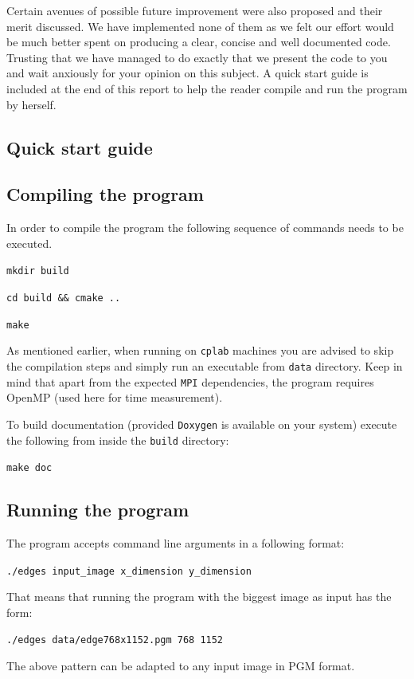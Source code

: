 \documentclass[11pt,a4paper]{article}
\begin{document}
Certain avenues of possible future improvement were also proposed and their merit discussed.
We have implemented none of them as we felt our effort would be much better spent on producing a clear, concise and well documented code.
Trusting that we have managed to do exactly that we present the code to you and wait anxiously for your opinion on this subject.
A quick start guide is included at the end of this report to help the reader compile and run the program by herself.



\newpage
\begin{appendices}
\section{Quick start guide}
\subsection{Compiling the program}
\label{sec:comp}
In order to compile the program the following sequence of commands needs to be executed.

\vspace{5pt}
\noindent \texttt{mkdir build}

\noindent \texttt{cd build \&\& cmake ..}

\noindent \texttt{make}
\vspace{5pt}

\noindent As mentioned earlier, when running on \texttt{cplab} machines you are advised to skip the compilation steps and simply run an executable from \texttt{data} directory.
Keep in mind that apart from the expected \texttt{MPI} dependencies, the program requires OpenMP (used here for time measurement).

\noindent To build documentation (provided \texttt{Doxygen} is available on your system) execute the following from inside the \texttt{build} directory:

\vspace{5pt}
\noindent \texttt{make doc}
\vspace{5pt}

\subsection{Running the program}
The program accepts command line arguments in a following format:

\vspace{5pt}
\noindent \texttt{./edges input\_image x\_dimension y\_dimension}
\vspace{5pt}

\noindent That means that running the program with the biggest image as input has the form:

\vspace{5pt}
\noindent \texttt{./edges data/edge768x1152.pgm 768 1152}
\vspace{5pt}

\noindent The above pattern can be adapted to any input image in PGM format.

\end{appendices}
\end{document}
